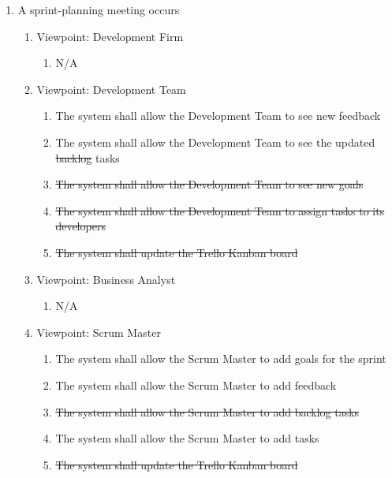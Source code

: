 \documentclass[12pt, titlepage]{article}
\begin{document}
\begin{enumerate}[{BE}1.]
	\item A sprint-planning meeting occurs %
	\begin{enumerate}[{VP}1.] 
	    \item Viewpoint: Development Firm
	        \begin{enumerate}
	            \item[] N/A
	        \end{enumerate}
	    \item Viewpoint: Development Team
	        \begin{enumerate}
	            \item The system shall allow the Development Team to see new feedback
	            \item The system shall allow the Development Team to see the updated \sout{backlog} tasks
	            \item \sout{The system shall allow the Development Team to see new goals}
	            \item \sout{The system shall allow the Development Team to assign tasks to its developers}
	            \item \sout{The system shall update the Trello Kanban board}
	        \end{enumerate}
		\item Viewpoint: Business Analyst
			\begin{enumerate}
			    \item[] N/A
			\end{enumerate}
		\item Viewpoint: Scrum Master
			\begin{enumerate}
	            \item The system shall allow the Scrum Master to add goals for the sprint
	            \item The system shall allow the Scrum Master to add feedback
	            \item \sout{The system shall allow the Scrum Master to add backlog tasks}
	            \item The system shall allow the Scrum Master to add tasks
	            \item \sout{The system shall update the Trello Kanban board}
			\end{enumerate}
	\end{enumerate}


\end{enumerate}
\end{document}
